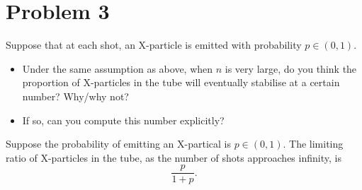 \section{Problem 3}

Suppose that at each shot, an X-particle is emitted with probability $p \in (0, 1)$.
\begin{itemize}

  \item Under the same assumption as above, when $n$ is very large, do you think the proportion of X-particles in the tube will eventually stabilise at a certain number? Why/why not?
  \item If so, can you compute this number explicitly?
\end{itemize}

\begin{theorem}
  Suppose the probability of emitting an X-partical is $p\in(0,1)$. The limiting ratio of X-particles in the tube, as the number of shots approaches infinity, is \[
  \frac{p}{1+p}
  .\]
\end{theorem}
